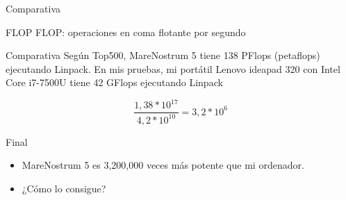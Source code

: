\documentclass[bigger]{beamer}
\begin{document}
\begin{frame}[label={sec:org7314344}]{Comparativa}
\begin{block}{FLOP}
FLOP: operaciones en coma flotante por segundo
\end{block}

\begin{block}{Comparativa}
Según Top500, MareNostrum 5 tiene 138 PFlops (petaflops) ejecutando Linpack.
En mis pruebas, mi portátil Lenovo ideapad 320 con Intel Core i7-7500U tiene 42 GFlops ejecutando Linpack

\begin{equation}
\frac{1,38 * 10^{17}}{4,2 * 10^{10}} = 3,2 * 10^6
\end{equation}
\end{block}
\end{frame}

\begin{frame}[label={sec:org21a9b9d}]{Final}
\begin{itemize}
\item MareNostrum 5 es 3,200,000 veces más potente que mi ordenador.
\item ¿Cómo lo consigue?
\end{itemize}
\end{frame}
\end{document}
